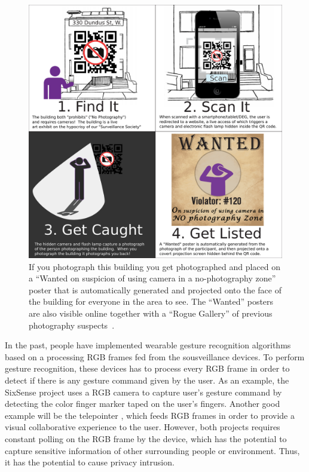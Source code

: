 \begin{figure}
  \centering
  \includegraphics[width=6.0in]{ch5/figs/signo330infographics_small.pdf}
  \caption{If you photograph this building you get photographed and placed on
           a ``Wanted on suspicion of using camera in a no-photography zone''
           poster that is automatically generated and projected onto the face
           of the building for everyone in the area to see.  The
           ``Wanted'' posters are also visible online together with
           a ``Rogue Gallery'' of previous photography suspects~\cite{lo2013augmediated}.}
  \label{infographic}
\end{figure}

In the past, people have implemented wearable gesture recognition algorithms based on a processing RGB frames fed from the sousveillance devices. To perform gesture recognition, these devices has to process every RGB frame in order to detect if there is any gesture command given by the user. As an example, the SixSense project uses a RGB camera to capture user's gesture command by detecting the color finger marker taped on the user's fingers. Another good example will be the telepointer \cite{mann2000telepointer}, which feeds RGB frames in order to provide a visual collaborative experience to the user. However, both projects requires constant polling on the RGB frame by the device, which has the potential to capture sensitive information of other surrounding people or environment. Thus, it has the potential to cause privacy intrusion. 

